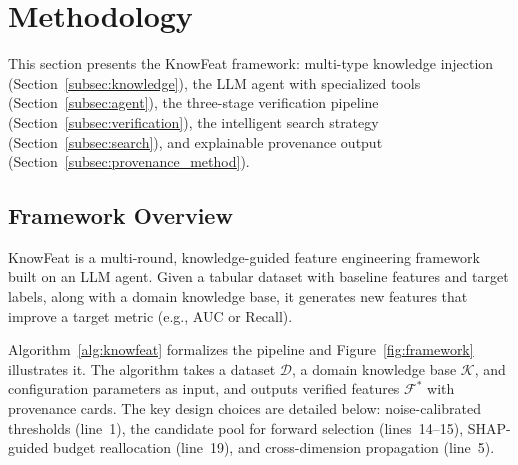 \section{Methodology}
\label{sec:method}

This section presents the KnowFeat framework: multi-type knowledge injection (Section~\ref{subsec:knowledge}), the LLM agent with specialized tools (Section~\ref{subsec:agent}), the three-stage verification pipeline (Section~\ref{subsec:verification}), the intelligent search strategy (Section~\ref{subsec:search}), and explainable provenance output (Section~\ref{subsec:provenance_method}).

\subsection{Framework Overview}
\label{subsec:overview}

KnowFeat is a multi-round, knowledge-guided feature engineering framework built on an LLM agent. Given a tabular dataset with baseline features and target labels, along with a domain knowledge base, it generates new features that improve a target metric (e.g., AUC or Recall).

Algorithm~\ref{alg:knowfeat} formalizes the pipeline and Figure~\ref{fig:framework} illustrates it. The algorithm takes a dataset $\mathcal{D}$, a domain knowledge base $\mathcal{K}$, and configuration parameters as input, and outputs verified features $\mathcal{F}^*$ with provenance cards. The key design choices are detailed below: noise-calibrated thresholds (line~1), the candidate pool for forward selection (lines~14--15), SHAP-guided budget reallocation (line~19), and cross-dimension propagation (line~5).

